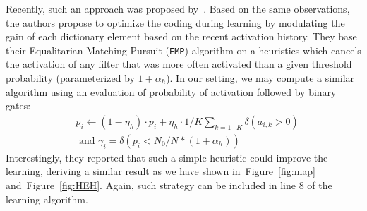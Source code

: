 \documentclass[letterpaper,final,conference,10pt]{IEEEtran}
\newcommand{\seeFig}[1]{Figure~\ref{fig:#1}}%
\begin{document}
Recently, such an approach was proposed by~\cite{Sandin17}. Based on the same observations, the authors propose to optimize the coding during learning by modulating the gain of each dictionary element based on the recent activation history. They base their Equalitarian Matching Pursuit (\texttt{EMP}) algorithm on a heuristics which cancels the activation of any filter that was more often activated than a given threshold probability (parameterized by $1+\alpha_h$). In our setting, we may compute a similar algorithm using an evaluation of probability of activation followed by binary gates:
\begin{align}%
&p_i \leftarrow (1- \eta_h ) \cdot p_i + \eta_h \cdot 1/K\sum_{k=1\cdots K} \delta(a_{i, k} > 0) \\ &\textrm{ and }
\gamma_i = \delta (p_i < N_0/N*(1+\alpha_h) )
\end{align}%
Interestingly, they reported that such a simple heuristic could improve the learning, deriving a similar result as we have shown in~\seeFig{map} and~\seeFig{HEH}. %
Again, such strategy can be included in line 8 of the learning algorithm.
\end{document}
